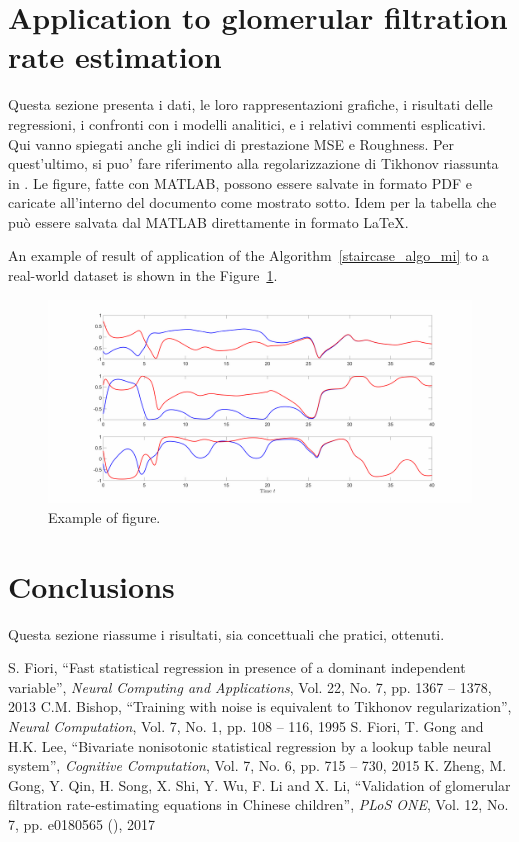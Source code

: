 \documentclass[10pt,final]{siamltex}
\begin{document}
\section{Application to glomerular filtration rate estimation}\label{sec3}
%
{{\red Questa sezione presenta i dati, le loro rappresentazioni grafiche, i risultati delle regressioni, i confronti con i modelli analitici, e i relativi commenti esplicativi. Qui vanno spiegati anche gli indici di prestazione MSE e Roughness. Per quest'ultimo, si puo' fare riferimento alla regolarizzazione di Tikhonov riassunta in \cite{bishop}. Le figure, fatte con MATLAB, possono essere salvate in formato PDF e caricate all'interno del documento come mostrato sotto. Idem per la tabella che può essere salvata dal MATLAB direttamente in formato LaTeX.}}

An example of result of application of the Algorithm~\ref{staircase_algo_mi} to a real-world dataset is shown in the Figure~\ref{bodyfat}.

\vspace{5mm}
%
\begin{figure}[h!]
  \centering
  \includegraphics[scale=0.3]{Experiment1a}
  \caption{Example of figure.}
  \label{bodyfat}
\end{figure}
%
%
\section{Conclusions}\label{sec4}
%
{{\red Questa sezione riassume i risultati, sia concettuali che pratici, ottenuti.}}
%
\begin{thebibliography}{99}
   S. Fiori, ``Fast statistical regression in presence of a dominant independent variable'', \textit{Neural Computing and Applications}, Vol. 22, No. 7, pp. 1367 -- 1378, 2013
   C.M. Bishop, ``Training with noise is equivalent to Tikhonov regularization'', \textit{Neural Computation}, Vol. 7, No. 1, pp. 108 -- 116, 1995
   S. Fiori, T. Gong and H.K. Lee, ``Bivariate nonisotonic statistical regression by a lookup table neural system'', \textit{Cognitive Computation}, Vol. 7, No. 6, pp. 715 -- 730, 2015
   K. Zheng, M. Gong, Y. Qin, H. Song, X. Shi, Y. Wu, F. Li and X. Li, ``Validation of glomerular filtration rate-estimating equations in Chinese children'', \textit{PLoS ONE}, Vol. 12, No. 7, pp. e0180565 (), 2017
\end{thebibliography}
\end{document}
